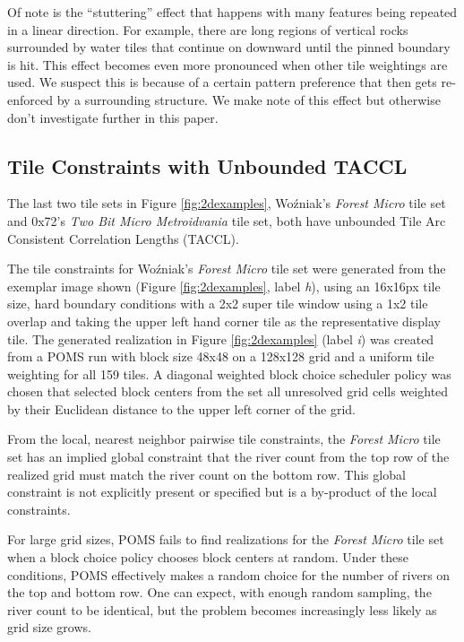 Of note is the ``stuttering'' effect that happens with many features being repeated in a linear direction.
For example, there are long regions of vertical rocks surrounded by water tiles that continue on downward until the
pinned boundary is hit.
This effect becomes even more pronounced when other tile weightings are used.
We suspect this is because of a certain pattern preference that then gets re-enforced
by a surrounding structure.
We make note of this effect but otherwise don't investigate further in this paper.

\subsection{Tile Constraints with Unbounded TACCL}

The last two tile sets in Figure \ref{fig:2dexamples}, Wo\'zniak's \textit{Forest Micro} tile set and 0x72's \textit{Two Bit Micro Metroidvania} tile set,
both have unbounded Tile Arc Consistent Correlation Lengths (TACCL).

The tile constraints for Wo\'zniak's \textit{Forest Micro} tile set were generated from the exemplar image shown (Figure \ref{fig:2dexamples}, label \textit{h}), using
an 16x16px tile size, hard boundary conditions with a 2x2 super tile window using a 1x2 tile overlap and taking the upper left hand corner tile as the representative
display tile.
The generated realization in Figure \ref{fig:2dexamples} (label \textit{i}) was created from a POMS run with block size 48x48 on a 128x128 grid
and a uniform tile weighting for all 159 tiles.
A diagonal weighted block choice scheduler policy was chosen that selected block centers from the set all unresolved grid cells weighted by their Euclidean distance
to the upper left corner of the grid.

From the local, nearest neighbor pairwise tile constraints,
the \textit{Forest Micro} tile set has an implied global constraint that the river count from the top row of the realized
grid must match the river count on the bottom row.
This global constraint is not explicitly present or specified but is a by-product of the local constraints.

For large grid sizes, POMS fails to find realizations for the \textit{Forest Micro} tile set when a block
choice policy chooses block centers at random.
Under these conditions, POMS effectively makes a random choice for the number of rivers on the top and bottom row.
One can expect, with enough random sampling, the river count to be identical, but the problem
becomes increasingly less likely as grid size grows.


